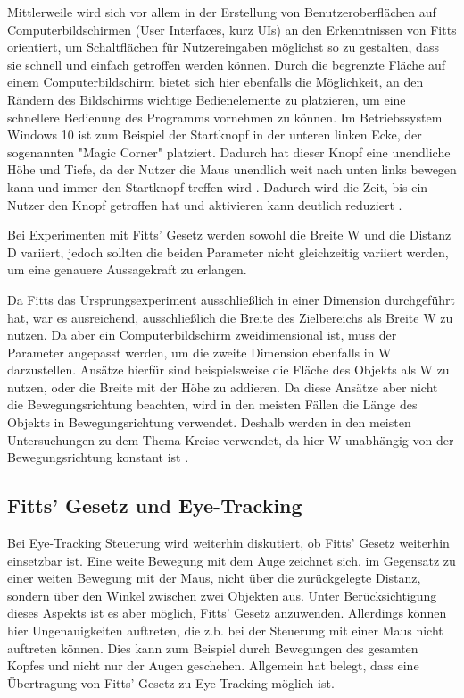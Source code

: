 Mittlerweile wird sich vor allem in der Erstellung von Benutzeroberflächen auf Computerbildschirmen (User Interfaces, kurz UIs) an den Erkenntnissen von Fitts  orientiert, um Schaltflächen für Nutzereingaben möglichst so zu gestalten, dass sie schnell und einfach getroffen werden können\cite{Kexugit.2006}. Durch die begrenzte Fläche auf einem Computerbildschirm bietet sich hier ebenfalls die Möglichkeit, an den Rändern des Bildschirms wichtige Bedienelemente zu platzieren, um eine schnellere Bedienung des Programms vornehmen zu können. Im Betriebssystem Windows 10 ist zum Beispiel der Startknopf in der unteren linken Ecke, der sogenannten "Magic Corner" platziert\cite{Kexugit.2006}. Dadurch hat dieser Knopf eine \glqq unendliche\grqq{} Höhe und Tiefe, da der Nutzer die Maus unendlich weit nach unten links bewegen kann und immer den Startknopf treffen wird \cite{Kexugit.2006}. Dadurch wird die Zeit, bis ein Nutzer den Knopf getroffen hat und aktivieren kann deutlich reduziert \cite{Soukoreff.2004}.

Bei Experimenten mit Fitts' Gesetz werden sowohl die Breite W und die Distanz D variiert, jedoch sollten die beiden Parameter nicht gleichzeitig variiert werden, um eine genauere Aussagekraft zu erlangen. 

Da Fitts das Ursprungsexperiment ausschließlich in einer Dimension durchgeführt hat, war es ausreichend, ausschließlich die Breite des Zielbereichs als Breite W zu nutzen. Da aber ein Computerbildschirm zweidimensional ist, muss der Parameter angepasst werden, um die zweite Dimension ebenfalls in W darzustellen. Ansätze hierfür sind beispielsweise die Fläche des Objekts als W zu nutzen, oder die Breite mit der Höhe zu addieren. Da diese Ansätze aber nicht die Bewegungsrichtung beachten, wird in den meisten Fällen die Länge des Objekts in Bewegungsrichtung verwendet. Deshalb werden in den meisten Untersuchungen zu dem Thema Kreise verwendet, da hier W unabhängig von der Bewegungsrichtung konstant ist \cite{Soukoreff.2004}. 

\subsection{Fitts' Gesetz und Eye-Tracking}
Bei Eye-Tracking Steuerung wird weiterhin diskutiert, ob Fitts' Gesetz weiterhin einsetzbar ist. Eine weite Bewegung mit dem Auge zeichnet sich, im Gegensatz zu einer weiten Bewegung mit der Maus, nicht über die zurückgelegte Distanz, sondern über den Winkel zwischen zwei Objekten aus. Unter Berücksichtigung dieses Aspekts ist es aber möglich, Fitts' Gesetz anzuwenden. Allerdings können hier Ungenauigkeiten auftreten, die z.b. bei der Steuerung mit einer Maus nicht auftreten können. Dies kann zum Beispiel durch Bewegungen des gesamten Kopfes und nicht nur der Augen geschehen. Allgemein hat \citeauthor{Miniotas.2000} belegt, dass eine Übertragung von Fitts' Gesetz zu Eye-Tracking möglich ist. \cite{Miniotas.2000}

